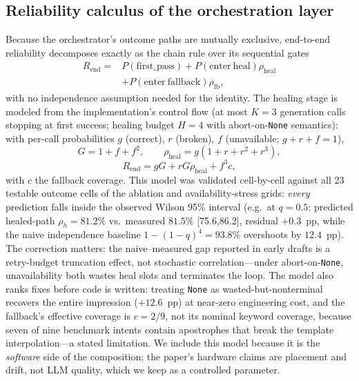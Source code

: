 \documentclass[journal,10pt,twocolumn]{IEEEtran}
\begin{document}
\subsection{Reliability calculus of the orchestration layer}
\label{sec:calculus}
Because the orchestrator's outcome paths are mutually exclusive, end-to-end reliability decomposes exactly as the
chain rule over its sequential gates
\begin{equation}\begin{split}
R_{\mathrm{end}}={}&P(\mathrm{first\_pass})+P(\mathrm{enter\ heal})\rho_{\mathrm{heal}}\\
&+P(\mathrm{enter\ fallback})\rho_{\mathrm{fb}},
\end{split}\label{eq:composition}
\end{equation}
with no independence assumption needed for the identity. The healing stage is modeled from the implementation's
control flow (at most $K{=}3$ generation calls stopping at first success; healing budget $H{=}4$ with
abort-on-\texttt{None} semantics): with per-call probabilities $g$ (correct), $r$ (broken), $f$ (unavailable;
$g{+}r{+}f{=}1$),
\begin{equation}
G=1+f+f^{2},\qquad \rho_{\mathrm{heal}}=g(1+r+r^{2}+r^{3}),
\label{eq:gamel}
\end{equation}
\begin{equation}
R_{\mathrm{end}}=gG+rG\rho_{\mathrm{heal}}+f^{3}c,
\label{eq:rheal}
\end{equation}
with $c$ the fallback coverage. This model was validated cell-by-cell against all 23 testable outcome cells of the
ablation and availability-stress grids: \emph{every} prediction falls inside the observed Wilson 95\% interval
(e.g.\ at $q{=}0.5$: predicted healed-path $\rho_h{=}81.2\%$ vs.\ measured $81.5\%$ [75.6,86.2], residual
$+0.3$~pp, while the naive independence baseline $1-(1-q)^{4}{=}93.8\%$ overshoots by $12.4$~pp). The correction
matters: the naive--measured gap reported in early drafts is a retry-budget truncation effect, not stochastic
correlation---under abort-on-\texttt{None}, unavailability both wastes heal slots and terminates the loop. The model
also ranks fixes before code is written: treating \texttt{None} as wasted-but-nonterminal recovers the entire
impression ($+12.6$~pp) at near-zero engineering cost, and the fallback's effective coverage is $c{=}2/9$, not its
nominal keyword coverage, because seven of nine benchmark intents contain apostrophes that break the template
interpolation---a stated limitation. We include this model because it is the \emph{software} side of the composition;
the paper's hardware claims are placement and drift, not LLM quality, which we keep as a controlled parameter.
\end{document}
